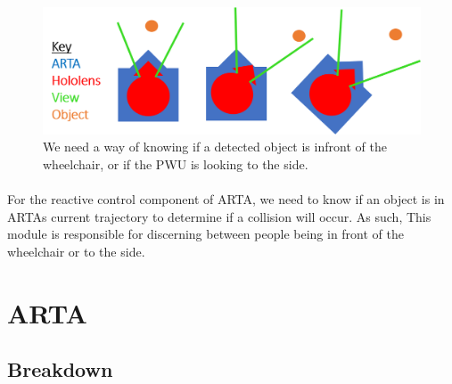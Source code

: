 \begin{figure}[ht!]
	\centering
	\includegraphics[width=0.9\linewidth]{img/chapter4_analysis/holoArtaAligned.png}
	\caption{We need a way of knowing if a detected object is infront of the wheelchair, or if the PWU is looking to the side. }
	\label{fig:holoArtaAlignment}
\end{figure}

\paragraph{}For the reactive control component of ARTA, we need to know if an object is in ARTAs current trajectory to determine if a collision will occur. As such, This module is responsible for discerning between people being in front of the wheelchair or to the side. 

\section{ARTA}
\subsection{Breakdown}


